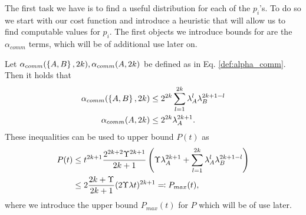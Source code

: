 The first task we have is to find a useful distribution for each of the $p_i$'s. To do so we start with our cost function and introduce a heuristic that will allow us to find computable values for $p_i$. The first objects we introduce bounds for are the $\alpha_{comm}$ terms, which will be of additional use later on. 
\begin{lemma} \label{lem:bounds_on_alpha_and_p}
Let $\alpha_{comm}(\left\{ A,B \right\}, 2k), \alpha_{comm}(A, 2k)$ be defined as in Eq. \eqref{def:alpha_comm}. Then it holds that 
\begin{align}
    \alpha_{comm}(\left\{ A,B \right\}, 2k) &\leq 2^{2k} \sum_{l = 1}^{2k} \lambda_A^{l} \lambda_B^{2k + 1 - l} \\
    \alpha_{comm}(A, 2k) &\leq 2^{2k} \lambda_A^{2k+1}.
\end{align}
These inequalities can be used to upper bound $P(t)$ as
\begin{align}
    P(t) &\leq t^{2k+1} \frac{2^{2k + 2} \Upsilon^{2k+1}}{2k+1} \left( \Upsilon \lambda_A^{2k+1} + \sum_{l = 1}^{2k} \lambda_A^{l} \lambda_B^{2k + 1 - l} \right) \\
    &\leq 2 \frac{2k + \Upsilon}{2k + 1} (2 \Upsilon \lambda t)^{2k+1} \eqqcolon P_{max}(t), \label{def:pMax}
\end{align}
where we introduce the upper bound $P_{max}(t)$ for $P$ which will be of use later.


\end{lemma}
